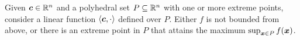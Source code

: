 \begin{theorem}
Given ${\boldsymbol c}\in\mathbb R^n$ and a polyhedral set $P \subseteq \mathbb R^n$ with one or more extreme points, consider a linear function $\left\langle{\boldsymbol c}, \cdot\right\rangle$ defined over $P$. Either $f$ is not bounded from above, or there is an extreme point in $P$ that attains the maximum $\sup_{{\boldsymbol x}\in P}f({\boldsymbol x})$. \hfill\qedsymbol
\end{theorem}

%
%
